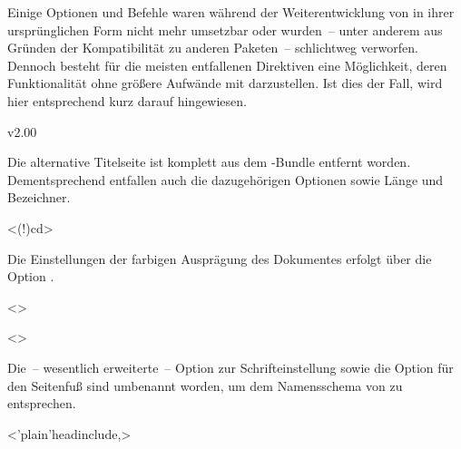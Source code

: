 \begin{NoIndexDefault}
Einige Optionen und Befehle waren während der Weiterentwicklung von \TUDScript
in ihrer ursprünglichen Form nicht mehr umsetzbar oder wurden~-- unter anderem 
aus Gründen der Kompatibilität zu anderen Paketen~-- schlichtweg verworfen. 
Dennoch besteht für die meisten entfallenen Direktiven eine Möglichkeit, deren 
Funktionalität ohne größere Aufwände mit \vTUDScript*{\TUDScript} darzustellen. 
Ist dies der Fall, wird hier entsprechend kurz darauf hingewiesen.



\begin{Cessations}{v2.00}
\begin{Cessation}
  {}
\begin{Cessation}
  {}
\begin{Cessation}
  {}
\begin{Cessation}
  {}
\printdeclarationlist

Die alternative Titelseite ist komplett aus dem \TUDScript-Bundle entfernt 
worden. Dementsprechend entfallen auch die dazugehörigen Optionen sowie Länge 
und Bezeichner.
\end{Cessation}
\end{Cessation}
\end{Cessation}
\end{Cessation}

\begin{Cessation}
  {}
  <\Option(!){cd}>
\printdeclarationlist

Die Einstellungen der farbigen Ausprägung des Dokumentes erfolgt über die 
Option .
\end{Cessation}

\begin{Cessation}
  {}
  <>
\begin{Cessation}
  {}
  <>
\printdeclarationlist

Die~-- wesentlich erweiterte~-- Option zur Schrifteinstellung sowie die Option 
für den Seitenfuß sind umbenannt worden, um dem Namensschema von \TUDScript zu 
entsprechen.
\end{Cessation}
\end{Cessation}

\begin{Cessation}
  {}
  <\Option'plain'{headinclude},>
\printdeclarationlist


\end{Cessation}
\end{Cessations}
\end{NoIndexDefault}

